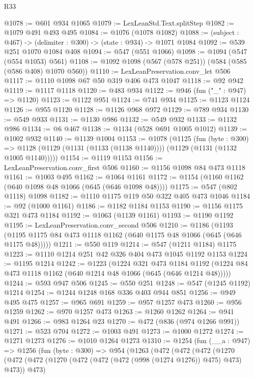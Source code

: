 \begin{lexlean}{R33}
\begin{coremodule}
@1078 := @601 @934 @1065
@1079 := LexLeanStd.Text.splitStep
@1082 := @1079 @491 @493 @495
@1084 := @1076 (@1078 @1082)
@1088 := (subject : @467) -> (delimiter : @300) -> (state : @934) -> @1071 @1084
@1092 := @539 @251 @1070 @1084 @408
@1094 := @547 (@551 @1066)
@1098 := @1094 (@547 (@554 @1053) @561)
@1108 := @1092 @1098 (@567 (@578 @251)) (@584 (@585 (@586 @408) @1070 @560))
@1110 := LexLeanPreservation.conv_let @506
@1117 := @1110 @1098 @67 @50 @319 @406 @473 @1047
@1118 := @92 @942
@1119 := @1117 @1118
@1120 := @483 @934
@1122 := @946 (fun ("_" : @947) => @1120)
@1123 := @1122 @951
@1124 := @741 @934
@1125 := @1123 @1124
@1126 := @955 @1120
@1128 := @1126 @968 @972
@1129 := @789 @934
@1130 := @549 @933
@1131 := @1130 @986
@1132 := @549 @932
@1133 := @1132 @986
@1134 := @6 @467
@1138 := @1134 (@528 @691 @1005 @1012)
@1139 := @1002 @932
@1140 := @1139 @1004
@1153 := @1078
    (@1125
      (fun (byte : @300) =>
      @1128 (@1129 (@1131 (@1133 (@1138 @1140)))) (@1129 (@1131 (@1132 @1005 @1140)))))
@1154 := @1119 @1153
@1156 := LexLeanPreservation.conv_first @506
@1160 := @1156 @1098 @84 @473 @1118
@1161 := @1003 @495
@1162 := @1064 @1161
@1172 := @1154 (@1160 @1162 (@640 @1098 @48 @1066 (@645 (@646 @1098 @48))))
@1175 := @547 (@802 @1118) @1098
@1182 := @1110 @1175 @119 @50 @322 @405 @473 @1046
@1184 := @92 (@1000 @1161)
@1186 := @1182 @1184 @1153
@1190 := @1156 @1175 @321 @473 @1184
@1192 := @1063 (@1139 @1161)
@1193 := @1190 @1192
@1195 := LexLeanPreservation.conv_second @506
@1210 := @1186
    (@1193 (@1195 @1175 @84 @473 @1118 @1162 (@640 @1175 @48 @1066 (@645 (@646 @1175 @48)))))
@1211 := @550 @119
@1214 := @547 (@1211 @1184) @1175
@1223 := @1110 @1214 @251 @42 @326 @404 @473 @1045 @1192 @1153
@1224 := @1195 @1214
@1242 := @1223
    (@1224
      @321
      @473
      @1184
      @1192
      (@1224 @84 @473 @1118 @1162 (@640 @1214 @48 @1066 (@645 (@646 @1214 @48)))))
@1244 := @593 @947 @506
@1245 := @550 @251
@1248 := @547 (@1245 @1192) @1214
@1254 := @1244 @1248 @168 @336 @403 @944 @851
@1256 := @949 @495 @475
@1257 := @965 @691
@1259 := @957 @1257 @473
@1260 := @956 @1259
@1262 := @970 @1257 @473
@1263 := @1260 @1262
@1264 := @941 @491
@1266 := @983 @1264 @23
@1270 := @472 (@836 (@974 @1266 @991))
@1271 := @523 @704
@1272 := @1003 @491
@1273 := @1000 @1272
@1274 := @1271 @1273
@1276 := @1010 @1264 @1273
@1310 := @1254
    (fun (__a : @947) =>
    @1256
      (fun (byte : @300) =>
      @954
        (@1263
          (@472
            (@472
              (@472
                (@1270
                  (@472
                    (@472 (@1270 (@472 (@472 (@472 (@998 (@1274 @1276)) @475) @473) @473)) @473)

\end{coremodule}
\end{lexlean}
